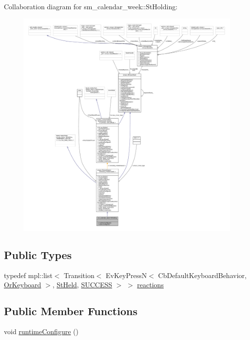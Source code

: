 Collaboration diagram for sm\+\_\+calendar\+\_\+week\+:\+:St\+Holding\+:
\nopagebreak
\begin{figure}[H]
\begin{center}
\leavevmode
\includegraphics[width=350pt]{structsm__calendar__week_1_1StHolding__coll__graph}
\end{center}
\end{figure}
\subsection*{Public Types}
\begin{DoxyCompactItemize}
\item 
typedef mpl\+::list$<$ Transition$<$ Ev\+Key\+PressN$<$ Cb\+Default\+Keyboard\+Behavior, \hyperlink{classsm__calendar__week_1_1OrKeyboard}{Or\+Keyboard} $>$, \hyperlink{structsm__calendar__week_1_1StHeld}{St\+Held}, \hyperlink{classSUCCESS}{S\+U\+C\+C\+E\+SS} $>$ $>$ \hyperlink{structsm__calendar__week_1_1StHolding_af43d292466f9a5e525ab003b45fb7a96}{reactions}
\end{DoxyCompactItemize}
\subsection*{Public Member Functions}
\begin{DoxyCompactItemize}
\item 
void \hyperlink{structsm__calendar__week_1_1StHolding_a3cab034e0028a8bad3efdcf2a2914b26}{runtime\+Configure} ()
\end{DoxyCompactItemize}
